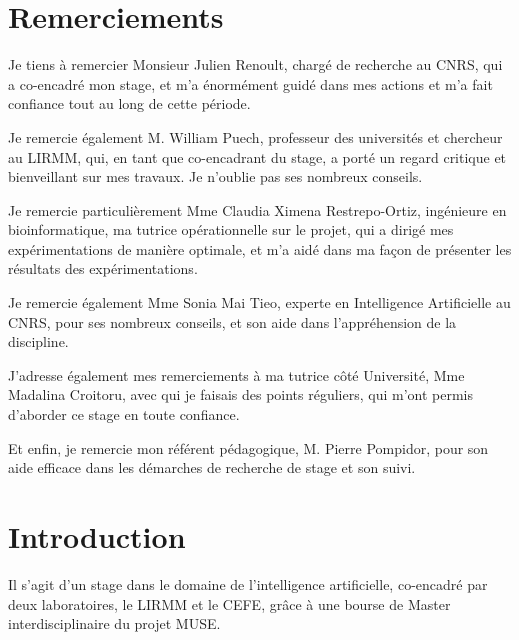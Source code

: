 \documentclass[a4paper,12pt]{article}
\begin{document}




\newpage

\newpage

\renewcommand{\contentsname}{Table des matières}

\tableofcontents

\newpage


\newpage

\section{Remerciements}
Je tiens à remercier Monsieur Julien Renoult, chargé de recherche au CNRS, qui a co-encadré mon stage, et m'a énormément guidé dans mes actions et m'a fait confiance tout au long de cette période.
\newline

Je remercie également M. William Puech, professeur des universités et chercheur au LIRMM, qui, en tant que co-encadrant du stage, a porté un regard critique et bienveillant sur mes travaux. Je n'oublie pas ses nombreux conseils.\newline

Je remercie particulièrement Mme Claudia Ximena Restrepo-Ortiz, ingénieure en bioinformatique, ma tutrice opérationnelle sur le projet, qui a dirigé mes expérimentations de manière optimale, et m'a aidé dans ma façon de présenter les résultats des expérimentations.\newline

Je remercie également Mme Sonia Mai Tieo, experte en Intelligence Artificielle au CNRS, pour ses nombreux conseils, et son aide dans l'appréhension de la discipline.\newline

J'adresse également mes remerciements à ma tutrice côté Université, Mme Madalina Croitoru, avec qui je faisais des points réguliers, qui m'ont permis d'aborder ce stage en toute confiance.\newline

Et enfin, je remercie mon référent pédagogique, M. Pierre Pompidor, pour son aide efficace dans les démarches de recherche de stage et son suivi. 
\newline

\newpage
\section{Introduction}
Il s'agit d'un stage dans le domaine de l'intelligence artificielle, co-encadré par deux laboratoires, le LIRMM et le CEFE, grâce à une bourse de Master interdisciplinaire du projet MUSE. \newline
\end{document}

